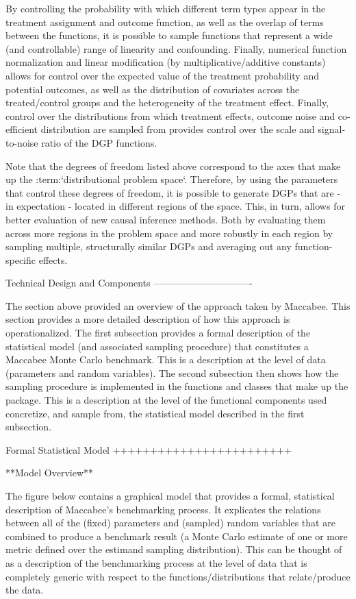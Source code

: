 \documentclass[../main.tex]{subfiles}
\begin{document}
By controlling the probability with which different term types appear in the treatment assignment and outcome function, as well as the overlap of terms between the functions, it is possible to sample functions that represent a wide (and controllable) range of linearity and confounding. Finally, numerical function normalization and linear modification (by multiplicative/additive constants) allows for control over the expected value of the treatment probability and potential outcomes, as well as the distribution of covariates across the treated/control groups and the heterogeneity of the treatment effect. Finally, control over the distributions from which treatment effects, outcome noise and co-efficient distribution are sampled from provides control over the scale and signal-to-noise ratio of the DGP functions.

Note that the degrees of freedom listed above correspond to the axes that make up the :term:`distributional problem space`. Therefore, by using the parameters that control these degrees of freedom, it is possible to generate DGPs that are - in expectation - located in different regions of the space. This, in turn, allows for better evaluation of new causal inference methods. Both by evaluating them across more regions in the problem space and more robustly in each region by sampling multiple, structurally similar DGPs and averaging out any function-specific effects.

Technical Design and Components
-------------------------------

The section above provided an overview of the approach taken by Maccabee. This section provides a more detailed description of how this approach is operationalized. The first subsection provides a formal description of the statistical model (and associated sampling procedure) that constitutes a Maccabee Monte Carlo benchmark. This is a description at the level of data (parameters and random variables). The second subsection then shows how the sampling procedure is implemented in the functions and classes that make up the package. This is a description at the level of the functional components used concretize, and sample from, the statistical model described in the first subsection.

Formal Statistical Model
++++++++++++++++++++++++

**Model Overview**

The figure below contains a graphical model that provides a formal, statistical description of Maccabee's benchmarking process. It explicates the relations between all of the (fixed) parameters and (sampled) random variables that are combined to produce a benchmark result (a Monte Carlo estimate of one or more metric defined over the estimand sampling distribution). This can be thought of as a description of the benchmarking process at the level of data that is completely generic with respect to the functions/distributions that relate/produce the data.
\end{document}
